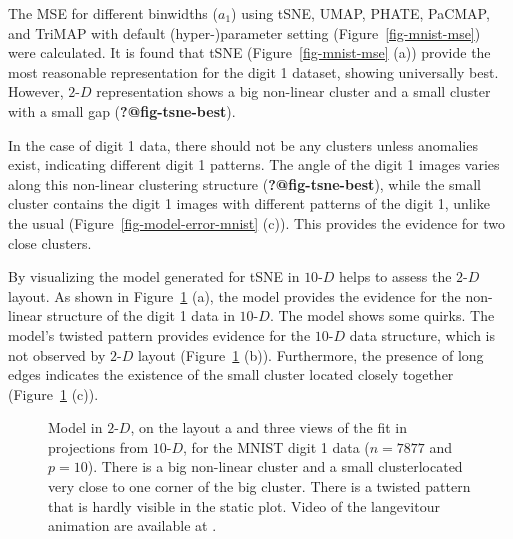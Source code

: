 \documentclass[
  12pt]{article}
\newcommand\gD{$2\text{-}D$}
\begin{document}
The MSE for different binwidths (\(a_1\)) using tSNE, UMAP, PHATE,
PaCMAP, and TriMAP with default (hyper-)parameter setting
(Figure~\ref{fig-mnist-mse}) were calculated. It is found that tSNE
(Figure~\ref{fig-mnist-mse} (a)) provide the most reasonable
representation for the digit 1 dataset, showing universally best.
However, \gD{} representation shows a big non-linear cluster and a small
cluster with a small gap (\textbf{?@fig-tsne-best}).

In the case of digit 1 data, there should not be any clusters unless
anomalies exist, indicating different digit 1 patterns. The angle of the
digit 1 images varies along this non-linear clustering structure
(\textbf{?@fig-tsne-best}), while the small cluster contains the digit 1
images with different patterns of the digit 1, unlike the usual
(Figure~\ref{fig-model-error-mnist} (c)). This provides the evidence for
two close clusters.

By visualizing the model generated for tSNE in \(10\text{-}D\) helps to
assess the \gD{} layout. As shown in Figure~\ref{fig-mnist-tri-proj}
(a), the model provides the evidence for the non-linear structure of the
digit 1 data in \(10\text{-}D\). The model shows some quirks. The
model's twisted pattern provides evidence for the \(10\text{-}D\) data
structure, which is not observed by \gD{} layout
(Figure~\ref{fig-mnist-tri-proj} (b)). Furthermore, the presence of long
edges indicates the existence of the small cluster located closely
together (Figure~\ref{fig-mnist-tri-proj} (c)).

\begin{figure}[H]


\caption{\label{fig-mnist-tri-proj}Model in \gD{}, on the layout a and
three views of the fit in projections from \(10\text{-}D\), for the
MNIST digit 1 data (\(n =  7877\) and \(p = 10\)). There is a big
non-linear cluster and a small clusterlocated very close to one corner
of the big cluster. There is a twisted pattern that is hardly visible in
the static plot. Video of the langevitour animation are available at .}

\end{figure}%
\end{document}
